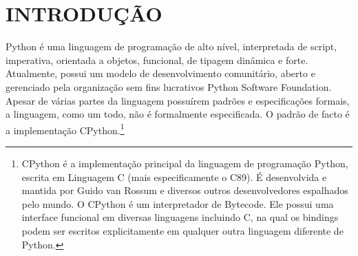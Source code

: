 
\chapter{INTRODUÇÃO}

\label{chap:introducao}

Python é uma linguagem de programação de alto nível, interpretada de script, imperativa, orientada a objetos, funcional, de tipagem dinâmica e forte. 
Atualmente, possui um modelo de desenvolvimento comunitário, aberto e gerenciado pela organização sem fins lucrativos Python Software Foundation.
Apesar de várias partes da linguagem possuírem padrões e especificações formais, a linguagem, como um todo, não é formalmente especificada.
O padrão de facto é a implementação CPython.\footnote{
    CPython é a implementação principal da linguagem de programação Python, escrita em Linguagem C (mais especificamente o C89).
    É desenvolvida e mantida por Guido van Rossum e diversos outros desenvolvedores espalhados pelo mundo.
    O CPython é um interpretador de Bytecode. Ele possui uma interface funcional em diversas linguagens incluindo C, na qual os bindings podem ser escritos explicitamente em qualquer outra linguagem diferente de Python.
}
 
